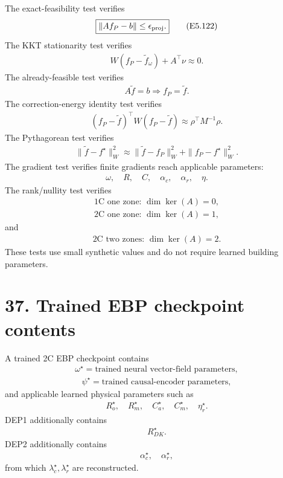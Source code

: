 \documentclass[11pt]{article}
\begin{document}
The exact-feasibility test verifies
\begin{align}
\boxed{\|Af_P-b\|\le\epsilon_{\rm proj}.}
\tag{E5.122}
\end{align}
The KKT stationarity test verifies
\begin{align}
\boxed{W(f_P-\widetilde f_\omega)+A^\top\nu\approx0.}
\tag{E5.123}
\end{align}
The already-feasible test verifies
\begin{align}
\boxed{A\widetilde f=b\Rightarrow f_P=\widetilde f.}
\tag{E5.124}
\end{align}
The correction-energy identity test verifies
\begin{align}
\boxed{(f_P-\widetilde f)^\top W(f_P-\widetilde f)\approx\rho^\top M^{-1}\rho.}
\tag{E5.125}
\end{align}
The Pythagorean test verifies
\begin{align}
\boxed{\|\widetilde f-f^\star\|_W^2\approx\|\widetilde f-f_P\|_W^2+\|f_P-f^\star\|_W^2.}
\tag{E5.126}
\end{align}
The gradient test verifies finite gradients reach applicable parameters:
\begin{align}
\boxed{\omega,\quad R,\quad C,\quad\alpha_c,\quad\alpha_r,\quad\eta.}
\tag{E5.127}
\end{align}
The rank/nullity test verifies
\begin{align}
\boxed{\text{1C one zone: }\dim\ker(A)=0,}
\tag{E5.128}
\end{align}
\begin{align}
\boxed{\text{2C one zone: }\dim\ker(A)=1,}
\tag{E5.129}
\end{align}
and
\begin{align}
\boxed{\text{2C two zones: }\dim\ker(A)=2.}
\tag{E5.130}
\end{align}
These tests use small synthetic values and do not require learned building parameters.

\section*{37. Trained EBP checkpoint contents}

A trained 2C EBP checkpoint contains
\begin{align}
\boxed{\omega^\star=\text{trained neural vector-field parameters},}
\tag{E5.131}
\end{align}
\begin{align}
\boxed{\psi^\star=\text{trained causal-encoder parameters},}
\tag{E5.132}
\end{align}
and applicable learned physical parameters such as
\begin{align}
\boxed{R_o^\star,\quad R_m^\star,\quad C_a^\star,\quad C_m^\star,\quad\eta_r^\star.}
\tag{E5.133}
\end{align}
DEP1 additionally contains
\begin{align}
\boxed{R_{DK}^\star.}
\tag{E5.134}
\end{align}
DEP2 additionally contains
\begin{align}
\boxed{\alpha_c^\star,\quad\alpha_r^\star,}
\tag{E5.135}
\end{align}
from which \(\lambda_c^\star,\lambda_r^\star\) are reconstructed.
\end{document}
